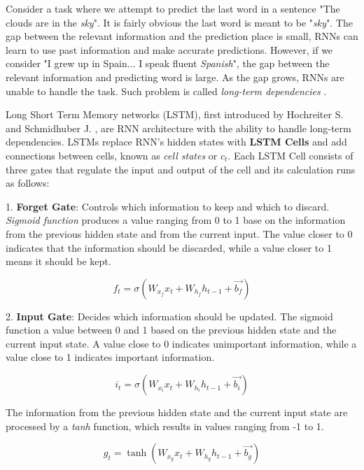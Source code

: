 Consider a task where we attempt to predict the last word in a sentence "The clouds are in the \textit{sky}". It is fairly obvious the last word is meant to be "\textit{sky}". The gap between the relevant information and the prediction place is small, RNNs can learn to use past information and make accurate predictions. However, if we consider "I grew up in Spain... I speak fluent \textit{Spanish}", the gap between the relevant information and predicting word is large. As the gap grows, RNNs are unable to handle the task. Such problem is called \textit{long-term dependencies} \cite{colahLSTM}.

Long Short Term Memory networks (LSTM), first introduced by Hochreiter S. and Schmidhuber J. \cite{hochreiterLSTM}, are RNN architecture with the ability to handle long-term dependencies. LSTMs replace RNN's hidden states with \textbf{LSTM Cells} and add connections between cells, known as \textit{cell states} or $c_{t}$. Each LSTM Cell consists of three gates that regulate the input and output of the cell and its calculation runs as follows:

1. \textbf{Forget Gate}: Controls which information to keep and which to discard. \textit{Sigmoid function} produces a value ranging from 0 to 1 base on the information from the previous hidden state and from the current input. The value closer to 0 indicates that the information should be discarded, while a value closer to 1 means it should be kept.

\begin{equation}
    {f_t = \sigma(W_{x_f}x_t + W_{h_f}h_{t-1}+\vec{b_f})}
\end{equation}

2. \textbf{Input Gate}: Decides which information should be updated. The sigmoid function a value between 0 and 1 based on the previous hidden state and the current input state. A value close to 0 indicates unimportant information, while a value close to 1 indicates important information.

\begin{equation}
    {i_t = \sigma(W_{x_i}x_t + W_{h_i}h_{t-1}+\vec{b_i})}
\end{equation}

The information from the previous hidden state and the current input state are processed by a \textit{tanh} function, which results in values ranging from -1 to 1.

\begin{equation}
    {g_t = \tanh(W_{x_g}x_t + W_{h_g}h_{t-1}+\vec{b_g})}
\end{equation}

